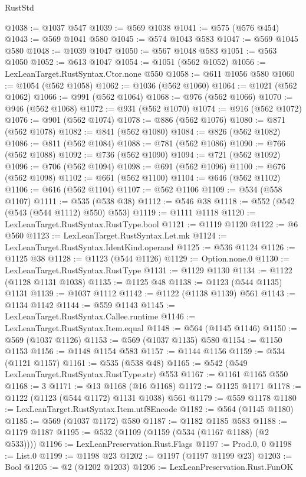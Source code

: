 \begin{lexlean}{RustStd}
\begin{coremodule}
@1038 := @1037 @547
@1039 := @569 @1038
@1041 := @575 (@576 @454)
@1043 := @569 @1041 @580
@1045 := @574 @1043 @583
@1047 := @569 @1045 @580
@1048 := @1039 @1047
@1050 := @567 @1048 @583
@1051 := @563 @1050
@1052 := @613 @1047
@1054 := @1051 (@562 @1052)
@1056 := LexLeanTarget.RustSyntax.Ctor.none @550
@1058 := @611 @1056 @580
@1060 := @1054 (@562 @1058)
@1062 := @1036 (@562 @1060)
@1064 := @1021 (@562 @1062)
@1066 := @991 (@562 @1064)
@1068 := @976 (@562 @1066)
@1070 := @946 (@562 @1068)
@1072 := @931 (@562 @1070)
@1074 := @916 (@562 @1072)
@1076 := @901 (@562 @1074)
@1078 := @886 (@562 @1076)
@1080 := @871 (@562 @1078)
@1082 := @841 (@562 @1080)
@1084 := @826 (@562 @1082)
@1086 := @811 (@562 @1084)
@1088 := @781 (@562 @1086)
@1090 := @766 (@562 @1088)
@1092 := @736 (@562 @1090)
@1094 := @721 (@562 @1092)
@1096 := @706 (@562 @1094)
@1098 := @691 (@562 @1096)
@1100 := @676 (@562 @1098)
@1102 := @661 (@562 @1100)
@1104 := @646 (@562 @1102)
@1106 := @616 (@562 @1104)
@1107 := @562 @1106
@1109 := @534 (@558 @1107)
@1111 := @535 (@538 @38)
@1112 := @546 @38
@1118 := @552 (@542 (@543 (@544 @1112) @550) @553)
@1119 := @1111 @1118
@1120 := LexLeanTarget.RustSyntax.RustType.bool
@1121 := @1119 @1120
@1122 := @6 @560
@1123 := LexLeanTarget.RustSyntax.Let.mk
@1124 := LexLeanTarget.RustSyntax.IdentKind.operand
@1125 := @536 @1124
@1126 := @1125 @38
@1128 := @1123 (@544 @1126)
@1129 := Option.none.{0}
@1130 := LexLeanTarget.RustSyntax.RustType
@1131 := @1129 @1130
@1134 := @1122 (@1128 @1131 @1038)
@1135 := @1125 @48
@1138 := @1123 (@544 @1135) @1131
@1139 := @1037 @1112
@1142 := @1122 (@1138 @1139) @561
@1143 := @1134 @1142
@1144 := @559 @1143
@1145 := LexLeanTarget.RustSyntax.Callee.runtime
@1146 := LexLeanTarget.RustSyntax.Item.equal
@1148 := @564 (@1145 @1146)
@1150 := @569 (@1037 @1126)
@1153 := @569 (@1037 @1135) @580
@1154 := @1150 @1153
@1156 := @1148 @1154 @583
@1157 := @1144 @1156
@1159 := @534 (@1121 @1157)
@1161 := @535 (@538 @48)
@1165 := @542 (@549 LexLeanTarget.RustSyntax.RustType.str) @553
@1167 := @1161 @1165 @550
@1168 := 3
@1171 := @13 @1168 (@16 @1168)
@1172 := @1125 @1171
@1178 := @1122 (@1123 (@544 @1172) @1131 @1038) @561
@1179 := @559 @1178
@1180 := LexLeanTarget.RustSyntax.Item.utf8Encode
@1182 := @564 (@1145 @1180)
@1185 := @569 (@1037 @1172) @580
@1187 := @1182 @1185 @583
@1188 := @1179 @1187
@1195 := @532 (@1109 (@1159 (@534 (@1167 @1188) (@2 @533))))
@1196 := LexLeanPreservation.Rust.Flags
@1197 := Prod.{0, 0}
@1198 := List.{0}
@1199 := @1198 @23
@1202 := @1197 (@1197 @1199 @23)
@1203 := Bool
@1205 := @2 (@1202 @1203)
@1206 := LexLeanPreservation.Rust.FunOK

\end{coremodule}
\end{lexlean}
